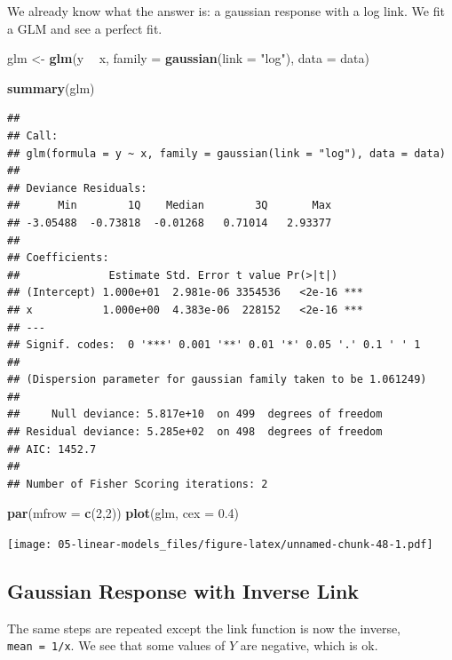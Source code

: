 \documentclass[
  openany]{book}
\newenvironment{Shaded}{\begin{snugshade}}{\end{snugshade}}
\newcommand{\DataTypeTok}[1]{\textcolor[rgb]{0.13,0.29,0.53}{#1}}
\newcommand{\DecValTok}[1]{\textcolor[rgb]{0.00,0.00,0.81}{#1}}
\newcommand{\FloatTok}[1]{\textcolor[rgb]{0.00,0.00,0.81}{#1}}
\newcommand{\KeywordTok}[1]{\textcolor[rgb]{0.13,0.29,0.53}{\textbf{#1}}}
\newcommand{\NormalTok}[1]{#1}
\newcommand{\OperatorTok}[1]{\textcolor[rgb]{0.81,0.36,0.00}{\textbf{#1}}}
\newcommand{\StringTok}[1]{\textcolor[rgb]{0.31,0.60,0.02}{#1}}
\begin{document}
We already know what the answer is: a gaussian response with a log link. We fit a GLM and see a perfect fit.

\begin{Shaded}
\begin{Highlighting}[]
\NormalTok{glm <-}\StringTok{ }\KeywordTok{glm}\NormalTok{(y }\OperatorTok{~}\StringTok{ }\NormalTok{x, }\DataTypeTok{family =} \KeywordTok{gaussian}\NormalTok{(}\DataTypeTok{link =} \StringTok{"log"}\NormalTok{), }\DataTypeTok{data =}\NormalTok{ data)}

\KeywordTok{summary}\NormalTok{(glm)}
\end{Highlighting}
\end{Shaded}

\begin{verbatim}
## 
## Call:
## glm(formula = y ~ x, family = gaussian(link = "log"), data = data)
## 
## Deviance Residuals: 
##      Min        1Q    Median        3Q       Max  
## -3.05488  -0.73818  -0.01268   0.71014   2.93377  
## 
## Coefficients:
##              Estimate Std. Error t value Pr(>|t|)    
## (Intercept) 1.000e+01  2.981e-06 3354536   <2e-16 ***
## x           1.000e+00  4.383e-06  228152   <2e-16 ***
## ---
## Signif. codes:  0 '***' 0.001 '**' 0.01 '*' 0.05 '.' 0.1 ' ' 1
## 
## (Dispersion parameter for gaussian family taken to be 1.061249)
## 
##     Null deviance: 5.817e+10  on 499  degrees of freedom
## Residual deviance: 5.285e+02  on 498  degrees of freedom
## AIC: 1452.7
## 
## Number of Fisher Scoring iterations: 2
\end{verbatim}

\begin{Shaded}
\begin{Highlighting}[]
\KeywordTok{par}\NormalTok{(}\DataTypeTok{mfrow =} \KeywordTok{c}\NormalTok{(}\DecValTok{2}\NormalTok{,}\DecValTok{2}\NormalTok{))}
\KeywordTok{plot}\NormalTok{(glm, }\DataTypeTok{cex =} \FloatTok{0.4}\NormalTok{)}
\end{Highlighting}
\end{Shaded}

\texttt{[image: 05-linear-models\_files/figure-latex/unnamed-chunk-48-1.pdf]}

\hypertarget{gaussian-response-with-inverse-link}{%
\subsection{Gaussian Response with Inverse Link}\label{gaussian-response-with-inverse-link}}

The same steps are repeated except the link function is now the inverse, \texttt{mean\ =\ 1/x}. We see that some values of \(Y\) are negative, which is ok.
\end{document}
